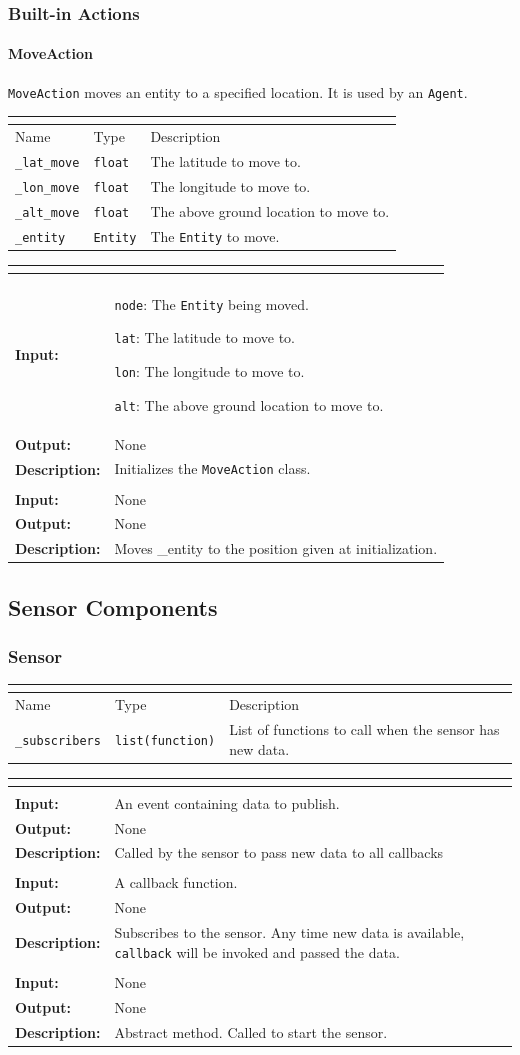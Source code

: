\documentclass[titlepage]{article}
\renewenvironment{itemize*}
    {\begin{itemize}
        \setlength{\itemsep}{0pt}%
        \setlength{\parskip}{0pt}%
        \setlength{\partopsep}{0pt}%
        \setlength{\topsep}{0pt}}%
    {\end{itemize}}
\newcommand{\operations}[1]{
\begin{center}
    \begin{longtable}{|p{4cm}|p{10cm + 2.0\tabcolsep}|}
    \hline
    \multicolumn{2}{|l|}{\cellcolor[gray]{0.5}{\textbf{Operations}}} \\ \hline
#1
    \end{longtable}
\end{center}
}
\newcommand{\operation}[4]{
    \hline
    \multicolumn{2}{|l|}{\cellcolor[gray]{0.8}{\texttt{#1}}} \\ \hline
    \hspace{7pt}\textbf{Input:} & #2 \\ \hline
    \hspace{7pt}\textbf{Output:} & #3 \\ \hline
    \hspace{7pt}\textbf{Description:} & #4 \\ \hline
}
\newcommand{\attributes}[1]{
    \begin{center}
        \begin{tabular}{|p{3.5cm}|p{3.5cm}|p{7cm}|}
            \multicolumn{3}{|l|}{\cellcolor[gray]{0.5}{\textbf{Attributes}}} \\ \hline
            \rowcolor[gray]{0.8} Name & Type & Description \\ \hline 
            #1
        \end{tabular}
    \end{center}
}
\newcommand{\attribute}[3]{
    \texttt{#1} & \texttt{#2} & #3 \\ \hline
}
\begin{document}
\subsubsection{Built-in Actions}
\paragraph{MoveAction}
{\texttt{MoveAction} moves an entity to a specified location. It is used by an \texttt{Agent}.}

\attributes{
    \attribute{\_lat\_move}{float}{The latitude to move to.}
    \attribute{\_lon\_move}{float}{The longitude to move to.}
    \attribute{\_alt\_move}{float}{The above ground location to move to.}
    \attribute{\_entity}{\texttt{Entity}}{The \texttt{Entity} to move.}
}

\operations{
    \operation{\_\_init\_\_(node,lat,lon,alt)}
    {
        \begin{itemize*}
            \item \texttt{node}: The \texttt{Entity} being moved. 
            \item \texttt{lat}: The latitude to move to. 
            \item \texttt{lon}: The longitude to move to. 
            \item \texttt{alt}: The above ground location to move to. 
        \end{itemize*}
    }{None}{Initializes the \texttt{MoveAction} class.}
    \operation{perform()}{None}{None}{Moves \_entity to the position given at initialization.}
}

\subsection{Sensor Components}
\subsubsection{Sensor}
\attributes
{
    \attribute{\_subscribers}{list(function)}{List of functions to call when the sensor has new data.}
}

\operations
{
    \operation{\_publish\_data(event)}{An event containing data to publish.}{None}{Called by the sensor to pass new data to all callbacks}
    \operation{subscribe(callback)}{A callback function.}{None}{Subscribes to the sensor.  Any time new data is available, \texttt{callback} will be invoked and passed the data.}
    \operation{run()}{None}{None}{Abstract method.  Called to start the sensor.}
}
\end{document}
